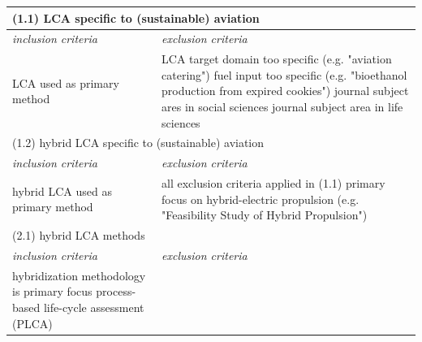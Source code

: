 \documentclass{article}
\begin{document}
            \begin{table}[htbp]
                \centering
                \begin{tabularx}{\textwidth}{| X | X |}
                    \hline
                \multicolumn{2}{|l|}{(1.1) LCA specific to (sustainable) aviation}  \\
                    \hline
                    \textit{inclusion criteria} & \textit{exclusion criteria} \\
                    \hline
                        LCA used as primary method  \newline
                    &
                        LCA target domain too specific \newline (e.g. "aviation catering") \newline
                        fuel input too specific \newline (e.g. "bioethanol production from expired cookies") \newline
                        journal subject ares in social sciences \newline
                        journal subject area in life sciences
                    \\
                    \hline
                \multicolumn{2}{|l|}{(1.2) hybrid LCA specific to (sustainable) aviation}  \\
                    \hline
                    \textit{inclusion criteria} & \textit{exclusion criteria} \\
                    \hline
                        hybrid LCA used as primary method  \newline
                    &
                        all exclusion criteria applied in (1.1) \newline
                        primary focus on hybrid-electric propulsion \newline
                        (e.g. "Feasibility Study of Hybrid Propulsion")
                    \\
                    \hline
                \multicolumn{2}{|l|}{(2.1) hybrid LCA methods}  \\
                    \hline
                    \textit{inclusion criteria} & \textit{exclusion criteria} \\
                    \hline
                        hybridization methodology is primary focus \newline
                        process-based life-cycle assessment (PLCA) \newline

\end{tabularx}
\end{table}
\end{document}
